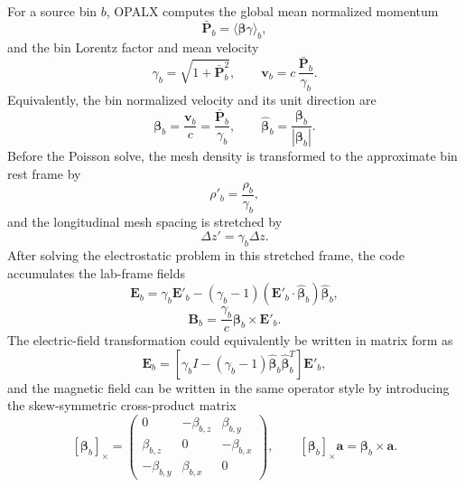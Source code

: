 \documentclass[11pt]{article}
\newcommand{\vect}[1]{\boldsymbol{#1}}
\newcommand{\E}{\vect{E}}
\newcommand{\B}{\vect{B}}
\newcommand{\Pmom}{\vect{P}}
\newcommand{\betav}{\boldsymbol{\beta}}
\numberwithin{equation}{section}
\begin{document}
For a source bin \(b\), OPALX computes the global mean normalized momentum
\begin{equation}
  \bar{\Pmom}_b = \langle \betav\gamma\rangle_b,
\end{equation}
and the bin Lorentz factor and mean velocity
\begin{equation}
  \gamma_b = \sqrt{1+\bar{\Pmom}_b^2},
  \qquad
  \vect v_b = c\,\frac{\bar{\Pmom}_b}{\gamma_b}.
\end{equation}
Equivalently, the bin normalized velocity and its unit direction are
\begin{equation}
  \label{eq:opalx-bin-beta}
  \betav_b =
  \frac{\vect v_b}{c}
  =
  \frac{\bar{\Pmom}_b}{\gamma_b},
  \qquad
  \hat{\betav}_b =
  \frac{\betav_b}{|\betav_b|}.
\end{equation}
Before the Poisson solve, the mesh density is transformed to the approximate bin
rest frame by
\begin{equation}
  \rho'_b = \frac{\rho_b}{\gamma_b},
\end{equation}
and the longitudinal mesh spacing is stretched by
\begin{equation}
  \Delta z' = \gamma_b \Delta z .
\end{equation}
After solving the electrostatic problem in this stretched frame, the code
accumulates the lab-frame fields
\begin{equation}
\label{eq:opalx-bin-e-field}
  \E_b =
  \gamma_b \E'_b
  -
  (\gamma_b-1)
  (\E'_b\cdot \hat{\betav}_b)\hat{\betav}_b,
\end{equation}
\begin{equation}
\label{eq:opalx-bin-b-field}
  \B_b =
  \frac{\gamma_b}{c}\betav_b \times \E'_b.
\end{equation}
The electric-field transformation could equivalently be written in matrix form
as
\begin{equation}
  \label{eq:opalx-bin-e-matrix}
  \E_b =
  \left[
    \gamma_b I
    -
    (\gamma_b-1)\hat{\betav}_b\hat{\betav}_b^T
  \right]\E'_b,
\end{equation}
and the magnetic field can be written in the same operator style by introducing
the skew-symmetric cross-product matrix
\begin{equation}
  \label{eq:opalx-bin-cross-matrix}
  [\betav_b]_\times =
  \begin{pmatrix}
    0 & -\beta_{b,z} & \beta_{b,y}\\
    \beta_{b,z} & 0 & -\beta_{b,x}\\
    -\beta_{b,y} & \beta_{b,x} & 0
  \end{pmatrix},
  \qquad
  [\betav_b]_\times \vect a = \betav_b\times\vect a.
\end{equation}
\end{document}
